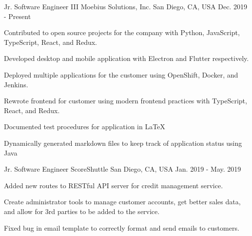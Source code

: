 

\begin{cventries}

	\cventry
	{Jr. Software Engineer III} %
	{Moebius Solutions, Inc.} %
	{San Diego, CA, USA} %
	{Dec. 2019 - Present} %
	{
		\begin{cvitems} %
			\item {Contributed to open source projects for the company with Python, JavaScript, TypeScript, React, and Redux.}
			\item {Developed desktop and mobile application with Electron and Flutter respectively.}
			\item {Deployed multiple applications for the customer using OpenShift, Docker, and Jenkins.}
			\item {Rewrote frontend for customer using modern frontend practices with TypeScript, React, and Redux.}
			\item {Documented test procedures for application in LaTeX}
			\item {Dynamically generated markdown files to keep track of application status using Java}
		\end{cvitems}
	}

	\cventry
	{Jr. Software Engineer} %
	{ScoreShuttle} %
	{San Diego, CA, USA} %
	{Jan. 2019 - May. 2019} %
	{
		\begin{cvitems} %
			\item {Added new routes to RESTful API server for credit management service.}
			\item {Create administrator tools to manage customer accounts, get better sales data, and allow for 3rd parties to be added to the service.}
			\item {Fixed bug in email template to correctly format and send emails to customers.}
		\end{cvitems}
	}

\end{cventries}
